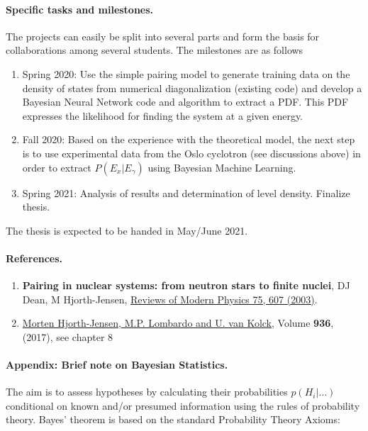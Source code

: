 \documentclass[%
oneside,                 %
final,                   %
10pt]{article}
\begin{document}
\paragraph{Specific tasks and milestones.}
The projects can easily be split into several parts and form the basis for collaborations among several students. The milestones are as follows
\begin{enumerate}
\item Spring 2020: Use the simple pairing model to generate training data on the density of states from numerical diagonalization (existing code) and develop a Bayesian Neural Network code and algorithm to extract a PDF. This PDF expresses the likelihood for finding the system at a given energy.

\item Fall 2020: Based on the experience with the theoretical model, the next step is to use experimental data from the Oslo cyclotron (see discussions above) in order to extract $P(E_x\vert E_{\gamma})$ using Bayesian Machine Learning.

\item Spring 2021: Analysis of results and determination of level density. Finalize thesis. 
\end{enumerate}

\noindent
The thesis is expected to be handed in May/June  2021.


\paragraph{References.}
\begin{enumerate}
\item \textbf{Pairing in nuclear systems: from neutron stars to finite nuclei}, DJ Dean, M Hjorth-Jensen, \href{{http://journals.aps.org/rmp/abstract/10.1103/RevModPhys.75.607}}{Reviews of Modern Physics 75, 607  (2003)}.

\item \href{{http://www.springer.com/us/book/9783319533353}}{Morten Hjorth-Jensen, M.P. Lombardo and U. van Kolck}, Volume \textbf{936}, (2017), see chapter 8
\end{enumerate}

\noindent
\paragraph{Appendix: Brief note on Bayesian Statistics.}
The aim is  to assess hypotheses by calculating their probabilities $p(H_i | \ldots)$ conditional on known and/or presumed information using the rules of probability theory.
Bayes' theorem is based on the standard  Probability Theory Axioms:
\end{document}

